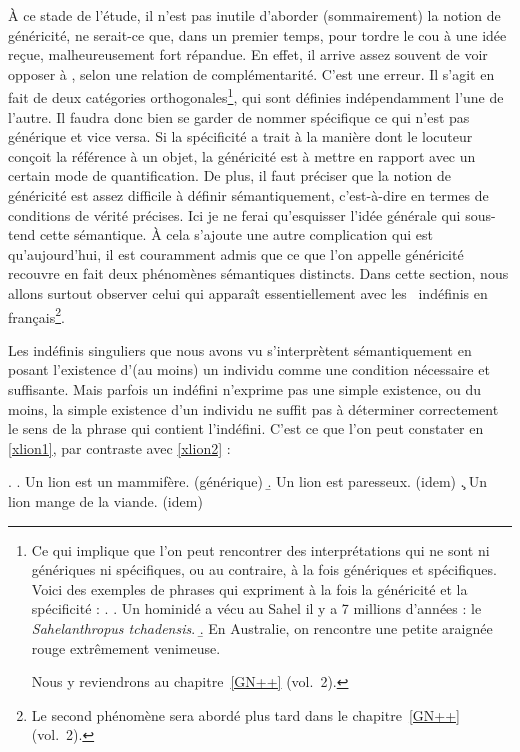 À ce stade de l'étude, il n'est pas inutile d'aborder (sommairement)
la notion de généricité, ne serait-ce que, dans un premier temps, pour
tordre le cou à une idée reçue, malheureusement fort répandue. En
effet, il arrive assez souvent de voir opposer  à ,
selon une relation de complémentarité.
C'est une erreur. Il s'agit en fait de deux catégories
orthogonales\footnote{Ce qui implique que l'on peut rencontrer des
interprétations qui ne sont ni génériques ni spécifiques, ou au
contraire, à la fois génériques et spécifiques. Voici des exemples de
phrases qui expriment à la fois la généricité et la spécificité :
\ExNBP
\ex. 
\a. Un hominidé a vécu au Sahel il y a 7 millions d'années : le \emph{Sahelanthropus tchadensis}.
\b. En Australie, on rencontre une petite araignée rouge extrêmement
venimeuse. 

Nous y reviendrons
au chapitre~\ref{GN++} (vol.~2).},
qui sont définies indépendamment l'une de l'autre.
Il faudra donc bien se garder de nommer spécifique ce qui n'est pas
générique et vice versa.
Si la spécificité a trait à la manière dont le locuteur conçoit la
référence à un objet, la généricité est à mettre en rapport avec un
certain mode de quantification. 
De plus, il faut préciser que la notion de généricité est assez difficile
à définir sémantiquement, c'est-à-dire en termes de conditions de
vérité précises. Ici je ne ferai qu'esquisser l'idée générale qui
sous-tend cette sémantique.
À cela s'ajoute une autre complication qui est qu'aujourd'hui, il est
couramment admis que ce que l'on appelle généricité recouvre en fait
deux phénomènes sémantiques distincts. Dans cette section, nous allons
surtout observer celui qui apparaît essentiellement avec les 
\GN\ indéfinis en français\footnote{Le second phénomène sera abordé
  plus tard dans le chapitre~\ref{GN++} (vol.~2).}.

Les {\GN} indéfinis singuliers que nous avons vu s'interprètent
sémantiquement en posant l'existence d'(au moins) un individu comme
une condition nécessaire et suffisante.  
Mais parfois un {\GN} indéfini n'exprime pas une simple existence, ou
du moins, la simple existence d'un individu ne suffit pas à déterminer
correctement le sens de la phrase qui contient l'indéfini.
C'est ce que l'on peut constater en \ref{xlion1}, par contraste avec \ref{xlion2} :

\ex.  \label{xlion1}
\a. Un lion est un mammifère. \label{xlion1a}\hfill  (générique)
\b. Un lion est paresseux.  \label{xlion1b} \hfill (idem)
\c. Un lion mange de la viande. \label{xlion1c} \hfill (idem)

